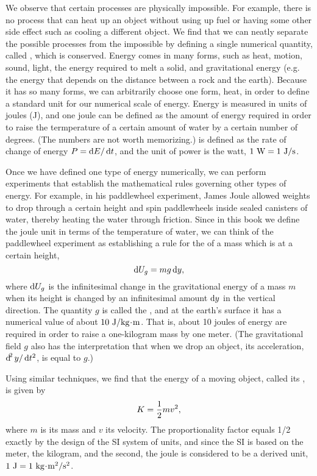 	We observe that certain processes are physically impossible. For example, there
	is no process that can heat up an object without using up fuel or having some
	other side effect such as cooling a different object. We find that we can
	neatly separate the possible processes from the impossible by
	defining a single numerical quantity, called , which is conserved.
	Energy comes in many forms, such as heat, motion, sound, light, the energy required to melt
	a solid, and gravitational energy (e.g. the energy that depends on the distance between
	a rock and the earth). Because it has so many forms, we can arbitrarily choose
	one form, heat, in order to define a standard unit for our numerical scale of energy.
	Energy is measured in units of joules (J), and one joule can be defined as the amount of energy
	required in order to raise the termperature of a certain amount of water by a certain number
	of degrees. (The numbers are not worth memorizing.)  is defined as the
	rate of change of energy $P=\operatorname{d\!} E/\operatorname{d\!} t$, and the unit of power is the watt,
	$1\ \zu{W}=1\ \junit/\sunit$.
	
	Once we have defined one type of energy numerically, we can perform experiments that establish
	the mathematical rules governing other types of energy. For example, in his paddlewheel
	experiment, James Joule allowed weights to drop through a certain height and spin
	paddlewheels inside sealed canisters of water, thereby heating the water through
	friction. Since in this book we define the joule unit in terms of the temperature of
	water, we can think of the paddlewheel experiment as establishing a rule for
	the  of a mass which is at a certain height,
	\begin{equation*}
		\operatorname{d\!} U_g	= mg\operatorname{d\!} y,
	\end{equation*}
	where $\operatorname{d\!} U_g$ is the infinitesimal change in the gravitational energy of
	a mass $m$ when its height is changed by an infinitesimal amount $\operatorname{d\!} y$ in the vertical direction.
	The quantity $g$ is called the , and at the earth's
	surface it has a numerical value of about $10\ \junit/\kgunit\unitdot\munit$. That is,
	about 10 joules of energy are required in order to raise a one-kilogram mass by
	one meter. (The gravitational field $g$ also has the interpretation that
	when we drop an object, its acceleration, $\operatorname{d\!}^2y/\operatorname{d\!} t^2$, is equal to
	$g$.)
	
	Using similar techniques, we find that the energy of a moving object, called its
	, is given by
	\begin{equation*}
		K	= \frac{1}{2}mv^2,
	\end{equation*}
	where $m$ is its mass and $v$ its velocity. The proportionality factor equals
	1/2 exactly by the design of the SI system of units, and since the SI is based
	on the meter, the kilogram, and the second, the joule is considered to be
	a derived unit, $1\ \junit=1\ \kgunit\unitdot\munit^2/\sunit^2$.
	

